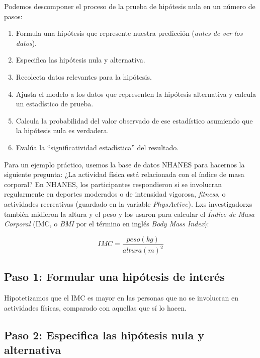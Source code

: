 \documentclass[
  12pt,
]{book}
\providecommand{\tightlist}{%
  \setlength{\itemsep}{0pt}\setlength{\parskip}{0pt}}
\begin{document}
Podemos descomponer el proceso de la prueba de hipótesis nula en un número de pasos:

\begin{enumerate}
\def\labelenumi{\arabic{enumi}.}
\tightlist
\item
  Formula una hipótesis que represente nuestra predicción (\emph{antes de ver los datos}).
\item
  Especifica las hipótesis nula y alternativa.
\item
  Recolecta datos relevantes para la hipótesis.
\item
  Ajusta el modelo a los datos que representen la hipótesis alternativa y calcula un estadístico de prueba.
\item
  Calcula la probabilidad del valor observado de ese estadístico asumiendo que la hipótesis nula es verdadera.
\item
  Evalúa la ``significatividad estadística'' del resultado.
\end{enumerate}

Para un ejemplo práctico, usemos la base de datos NHANES para hacernos la siguiente pregunta: ¿La actividad física está relacionada con el índice de masa corporal? En NHANES, los participantes respondieron si se involucran regularmente en deportes moderados o de intensidad vigorosa, \emph{fitness}, o actividades recreativas (guardado en la variable \(PhysActive\)). Lxs investigadorxs también midieron la altura y el peso y los usaron para calcular el \emph{Índice de Masa Corporal} (IMC, o \emph{BMI} por el término en inglés \emph{Body Mass Index}):

\[
IMC = \frac{peso(kg)}{altura(m)^2}
\]

\hypertarget{paso-1-formular-una-hipuxf3tesis-de-interuxe9s}{%
\subsection{Paso 1: Formular una hipótesis de interés}\label{paso-1-formular-una-hipuxf3tesis-de-interuxe9s}}

Hipotetizamos que el IMC es mayor en las personas que no se involucran en actividades físicas, comparado con aquellas que sí lo hacen.

\hypertarget{paso-2-especifica-las-hipuxf3tesis-nula-y-alternativa}{%
\subsection{Paso 2: Especifica las hipótesis nula y alternativa}\label{paso-2-especifica-las-hipuxf3tesis-nula-y-alternativa}}
\end{document}

